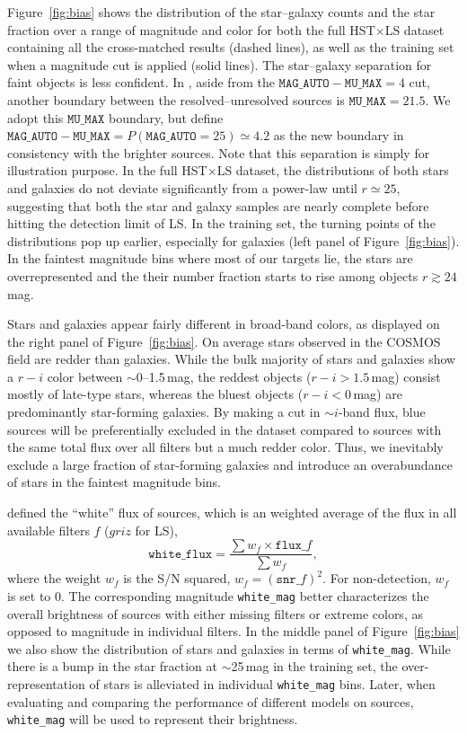 \documentclass[twocolumn,tighten]{aastex631}
\newcommand{\magauto}{\texttt{MAG\_AUTO}}
\begin{document}
\begin{CJK*}{UTF8}{gbsn}
Figure~\ref{fig:bias} shows the distribution of the star--galaxy counts and the star fraction over a range of magnitude and color for both the full HST$\times$LS dataset containing all the cross-matched results (dashed lines), as well as the training set when a magnitude cut is applied (solid lines). The star--galaxy separation for faint objects is less confident. In \cite{Leauthaud_2007}, aside from the $\texttt{MAG\_AUTO} - \texttt{MU\_MAX}=4$ cut, another boundary between the resolved--unresolved sources is $\texttt{MU\_MAX} = 21.5$. We adopt this $\texttt{MU\_MAX}$ boundary, but define $\texttt{MAG\_AUTO} - \texttt{MU\_MAX}=P(\magauto=25)\simeq 4.2$ as the new boundary in consistency with the brighter sources. Note that this separation is simply for illustration purpose. In the full HST$\times$LS dataset, the distributions of both stars and galaxies do not deviate significantly from a power-law until $r\simeq25$, suggesting that both the star and galaxy samples are nearly complete before hitting the detection limit of LS. In the training set, the turning points of the distributions pop up earlier, especially for galaxies (left panel of Figure~\ref{fig:bias}). In the faintest magnitude bins where most of our targets lie, the stars are overrepresented and the their number fraction starts to rise among objects $r\gtrsim24$\,mag.

Stars and galaxies appear fairly different in broad-band colors, as displayed on the right panel of Figure~\ref{fig:bias}. On average stars observed in the COSMOS field are redder than galaxies. While the bulk majority of stars and galaxies show a $r-i$ color between $\sim$0--1.5\,mag, the reddest objects ($r-i>1.5$\,mag) consist mostly of late-type stars, whereas the bluest objects ($r-i<0$\,mag) are predominantly star-forming galaxies. By making a cut in $\sim$$i$-band flux, blue sources will be preferentially excluded in the dataset compared to sources with the same total flux over all filters but a much redder color. Thus, we inevitably exclude a large fraction of star-forming galaxies and introduce an overabundance of stars in the faintest magnitude bins. 

 defined the ``white'' flux of sources, which is an weighted average of the flux in all available filters $f$ ($griz$ for LS),
\begin{equation}\label{eq:white_flux}
    \texttt{white\_flux} = \frac{\sum w_f\times \texttt{flux}\_f}{\sum w_f},
\end{equation}
where the weight $w_f$ is the S/N squared, $w_f=(\texttt{snr\_}f)^2$. For non-detection, $w_f$ is set to 0. The corresponding magnitude \texttt{white\_mag} better characterizes the overall brightness of sources with either missing filters or extreme colors, as opposed to magnitude in individual filters. In the middle panel of Figure~\ref{fig:bias} we also show the distribution of stars and galaxies in terms of \texttt{white\_mag}. While there is a bump in the star fraction at $\sim$25\,mag in the training set, the over-representation of stars is alleviated in individual \texttt{white\_mag} bins. Later, when evaluating and comparing the performance of different models on sources, \texttt{white\_mag} will be used to represent their brightness.


\end{CJK*}
\end{document}
